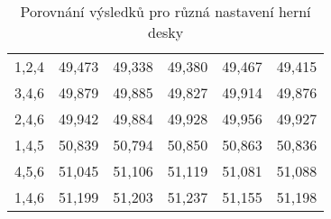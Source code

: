 {\begin{table}[H]
\begin{tabular}{c|cccc|c}
1,2,4                  & 49,473           & 49,338           & 49,380           & 49,467           & 49,415           \\
3,4,6                  & 49,879           & 49,885           & 49,827           & 49,914           & 49,876           \\
2,4,6                  & 49,942           & 49,884           & 49,928           & 49,956           & 49,927           \\
1,4,5                  & 50,839           & 50,794           & 50,850           & 50,863           & 50,836           \\
4,5,6                  & 51,045           & 51,106           & 51,119           & 51,081           & 51,088           \\
1,4,6                  & 51,199           & 51,203           & 51,237           & 51,155           & 51,198           \\
\hline
\end{tabular}
\caption{Porovnání výsledků pro různá nastavení herní desky}
\label{tab:SettingsAll}
\end{table}
}

